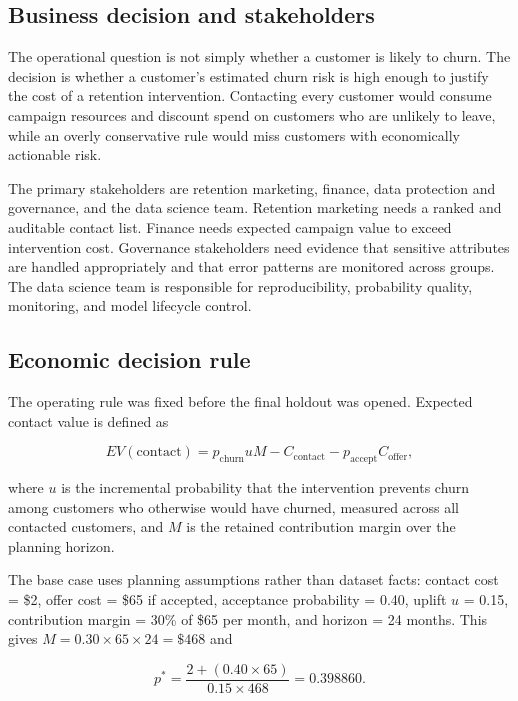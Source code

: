 \documentclass[11pt]{article}
\begin{document}
\subsection{Business decision and stakeholders}

The operational question is not simply whether a customer is likely to churn. The decision is whether a customer's estimated churn risk is high enough to justify the cost of a retention intervention. Contacting every customer would consume campaign resources and discount spend on customers who are unlikely to leave, while an overly conservative rule would miss customers with economically actionable risk.

The primary stakeholders are retention marketing, finance, data protection and governance, and the data science team. Retention marketing needs a ranked and auditable contact list. Finance needs expected campaign value to exceed intervention cost. Governance stakeholders need evidence that sensitive attributes are handled appropriately and that error patterns are monitored across groups. The data science team is responsible for reproducibility, probability quality, monitoring, and model lifecycle control.

\subsection{Economic decision rule}

The operating rule was fixed before the final holdout was opened. Expected contact value is defined as

\begin{equation}
EV(\text{contact}) = p_{\text{churn}}uM - C_{\text{contact}} - p_{\text{accept}}C_{\text{offer}},
\end{equation}

where $u$ is the incremental probability that the intervention prevents churn among customers who otherwise would have churned, measured across all contacted customers, and $M$ is the retained contribution margin over the planning horizon.

The base case uses planning assumptions rather than dataset facts: contact cost = \$2, offer cost = \$65 if accepted, acceptance probability = 0.40, uplift $u$ = 0.15, contribution margin = 30\% of \$65 per month, and horizon = 24 months. This gives $M=0.30\times65\times24=\$468$ and

\begin{equation}
p^*=\frac{2+(0.40\times65)}{0.15\times468}=0.398860.
\end{equation}
\end{document}
